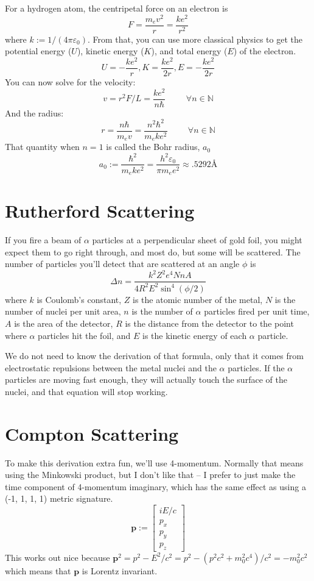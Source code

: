 \documentclass[12pt]{article}
\begin{document}
For a hydrogen atom, the centripetal force on an electron is
\[ F = \frac{m_e v^2}{r} = \frac{ke^2}{r^2} \]
where $k := 1 / (4 \pi \varepsilon_0)$. From that, you can use more classical physics to get the potential energy ($U$), kinetic energy ($K$), and total energy ($E$) of the electron.
\[ U =  - \frac{k e^2}{r} , K = \frac{k e^2}{2 r} , E = - \frac{k e^2}{2 r} \]
You can now solve for the velocity:
\[ v = r^2 F / L = \frac{k e^2}{n \hbar} \hspace{1cm} \forall n \in \mathbb{N}\]
And the radius:
\[ r = \frac{n \hbar}{m_e v} = \frac{n^2 \hbar^2}{m_e k e^2} \hspace{1cm} \forall n \in \mathbb{N} \]
That quantity when $n=1$ is called the Bohr radius, $a_0$
\[ a_0 := \frac{\hbar^2}{m_e k e^2} = \frac{h^2 \varepsilon_0}{\pi m_e e^2} \approx .5292 \text{\AA} \]

\section{Rutherford Scattering}
If you fire a beam of $\alpha$ particles at a perpendicular sheet of gold foil, you might expect them to go right through, and most do, but some will be scattered. The number of particles you'll detect that are scattered at an angle $\phi$ is
\[ \Delta n = \frac{k^2 Z^2 e^4 N n A}{4 R^2 E^2 \sin^4 (\phi / 2)} \]
where $k$ is Coulomb's constant, $Z$ is the atomic number of the metal, $N$ is the number of nuclei per unit area, $n$ is the number of $\alpha$ particles fired per unit time, $A$ is the area of the detector, $R$ is the distance from the detector to the point where $\alpha$ particles hit the foil, and $E$ is the kinetic energy of each $\alpha$ particle.

We do not need to know the derivation of that formula, only that it comes from electrostatic repulsions between the metal nuclei and the $\alpha$ particles. If the $\alpha$ particles are moving fast enough, they will actually touch the surface of the nuclei, and that equation will stop working.

\section{Compton Scattering}
To make this derivation extra fun, we'll use 4-momentum. Normally that means using the Minkowski product, but I don't like that -- I prefer to just make the time component of 4-momentum imaginary, which has the same effect as using a (-1, 1, 1, 1) metric signature.
\[ \boldsymbol{p} := \begin{bmatrix}
    iE/c \\
    p_x \\
    p_y \\
    p_z
\end{bmatrix} \]
This works out nice because $\boldsymbol{p}^2 = p^2 - E^2/c^2 = p^2 - (p^2 c^2 + m_0^2 c^4) / c^2 = - m_0^2 c^2$ which means that $\boldsymbol{p}$ is Lorentz invariant.
\end{document}
